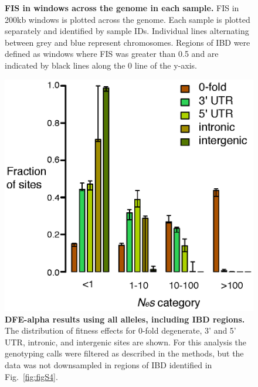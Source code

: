 \begin{figure}[h!]
    \caption{\textbf{FIS in windows across the genome in each sample.} FIS in 200kb windows is plotted across the genome. Each sample is plotted separately and identified by sample IDs. Individual lines alternating between grey and blue represent chromosomes. Regions of IBD were defined as windows where FIS was greater than 0.5 and are indicated by black lines along the 0 line of the y-axis.}
    \label{fig:figS5}
\end{figure}

\begin{figure}[h!]
      \centering
       \includegraphics[width=\linewidth]{Ch2FigS6}
    \caption{\textbf{DFE-alpha results using all alleles, including IBD regions.} The distribution of fitness effects for 0-fold degenerate, 3’ and 5’ UTR, intronic, and intergenic sites are shown. For this analysis the genotyping calls were filtered as described in the methods, but the data was not downsampled in regions of IBD identified in Fig.~\ref{fig:figS4}.}
    \label{fig:figS6}
\end{figure}

